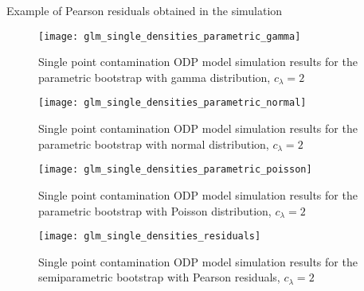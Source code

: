 \documentclass[a4paper]{book}
\begin{document}


\begin{table}[!htb]
  \begin{subtable}{\linewidth}
    
  \end{subtable}
  \newline
  \vspace*{0.25cm}
  \newline
  \begin{subtable}{\linewidth}
    
  \end{subtable}
  \caption{Example of Pearson residuals obtained in the simulation}
  \label{fig:glm-pears-sim-example}
\end{table}

\begin{landscape}
  \begin{figure}
    \centering
    \texttt{[image: glm\_single\_densities\_parametric\_gamma]}
    \caption{Single point contamination ODP model simulation results for the parametric bootstrap with gamma distribution, $c_\lambda = 2$}
    \label{fig:odp-single-param-gamma}
  \end{figure}
\end{landscape}

\begin{landscape}
  \begin{figure}
    \centering
    \texttt{[image: glm\_single\_densities\_parametric\_normal]}
    \caption{Single point contamination ODP model simulation results for the parametric bootstrap with normal distribution, $c_\lambda = 2$}
    \label{fig:odp-single-param-norm}
  \end{figure}
\end{landscape}

\begin{landscape}
  \begin{figure}
    \centering
    \texttt{[image: glm\_single\_densities\_parametric\_poisson]}
    \caption{Single point contamination ODP model simulation results for the parametric bootstrap with Poisson distribution, $c_\lambda = 2$}
    \label{fig:odp-single-param-pois}
  \end{figure}
\end{landscape}

\begin{landscape}
  \begin{figure}
    \centering
    \texttt{[image: glm\_single\_densities\_residuals]}
    \caption{Single point contamination ODP model simulation results for the semiparametric bootstrap with Pearson residuals, $c_\lambda = 2$}
    \label{fig:odp-single-semiparam}
  \end{figure}
\end{landscape}
\end{document}
